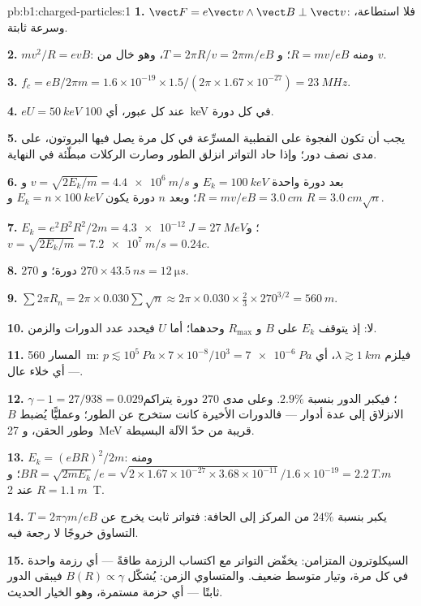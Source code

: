 \begin{solution}{pb:b1:charged-particles:1}
\textbf{1.} $\vect F = e\vect v\wedge\vect B \perp \vect v$: فلا استطاعة، وسرعة
ثابتة.

\textbf{2.} $mv^2/R = evB$: ومنه $R = mv/eB$؛ و $T = 2\pi R/v = 2\pi m/eB$، وهو خال من
$v$.

\textbf{3.} $f_c = eB/2\pi m = 1.6\times10^{-19} \times 1.5/(2\pi \times 1.67
\times10^{-27}) = \qty{23}{MHz}$.

\textbf{4.} $eU = \qty{50}{keV}$ عند كل عبور، أي \qty{100}{keV} في كل دورة.

\textbf{5.} يجب أن تكون الفجوة على القطبية المسرِّعة في كل مرة يصل
فيها البروتون، على مدى نصف دور؛ وإذا حاد التواتر انزلق الطور
وصارت الركلات مبطّئة في النهاية.

\textbf{6.} بعد دورة واحدة $E_k = \qty{100}{keV}$ و $v = \sqrt{2E_k/m} =
\qty{4.4e6}{m/s}$ و $R = mv/eB = \qty{3.0}{cm}$؛ وبعد $n$ دورة يكون $E_k =
n \times \qty{100}{keV}$ و $R = \qty{3.0}{cm}\sqrt n$.

\textbf{7.} $E_k = e^2B^2R^2/2m = \qty{4.3e-12}{J} = \qty{27}{MeV}$؛ و $v =
\sqrt{2E_k/m} = \qty{7.2e7}{m/s} = 0.24c$.

\textbf{8.} $270$ دورة؛ و $270 \times \qty{43.5}{ns} = \qty{12}{\micro s}$.

\textbf{9.} $\sum 2\pi R_n = 2\pi \times 0.030\sum\sqrt n \approx 2\pi \times 0.030
\times \tfrac23 \times 270^{3/2} = \qty{560}{m}$.

\textbf{10.} لا: إذ يتوقف $E_k$ على $B$ و $R_{\max}$ وحدهما؛ أما $U$ فيحدد
عدد الدورات والزمن.

\textbf{11.} المسار \qty{560}{m}: فيلزم $\lambda \gtrsim \qty{1}{km}$، أي
$p \lesssim 10^5\ \unit{Pa} \times 7\times10^{-8}/10^3 = \qty{7e-6}{Pa}$ ---
أي خلاء عال.

\textbf{12.} $\gamma - 1 = 27/938 = 0.029$؛ فيكبر الدور بنسبة $2.9\%$.
وعلى مدى $270$ دورة يتراكم الانزلاق إلى عدة أدوار --- فالدورات
الأخيرة كانت ستخرج عن الطور؛ وعمليًّا يُضبط $B$ وطور الحقن،
و \qty{27}{MeV} قريبة من حدّ الآلة البسيطة.

\textbf{13.} $E_k = (eBR)^2/2m$: ومنه $BR = \sqrt{2mE_k}/e = \sqrt{2 \times 1.67\times
10^{-27} \times 3.68\times10^{-11}}/1.6\times10^{-19} = \qty{2.2}{T.m}$؛ و $R =
\qty{1.1}{m}$ عند \qty{2}{T}.

\textbf{14.} $T = 2\pi\gamma m/eB$ يكبر بنسبة $24\%$ من المركز إلى الحافة: فتواتر
ثابت يخرج عن التساوق خروجًا لا رجعة فيه.

\textbf{15.} السيكلوترون المتزامن: يخفّض التواتر مع اكتساب الرزمة
طاقةً --- أي رزمة واحدة في كل مرة، وتيار متوسط ضعيف. والمتساوي الزمن:
يُشكّل $B(R) \propto \gamma$ فيبقى الدور ثابتًا --- أي حزمة
مستمرة، وهو الخيار الحديث.


\end{solution}
